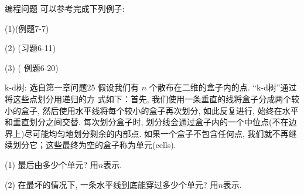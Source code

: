 \begin{exercise}{编程问题}
    可以参考完成下列例子: 

(1)(\cite{liu2014}例题7-7)

(2) (\cite{liu2014}习题6-11)

(3) (\cite{liu2014} 例题6-20)
    
\end{exercise}

\begin{exercise}{k-d树: 选自\cite{algobook}第一章问题25}
    假设我们有 $n$ 个散布在二维的盒子内的点. ``k-d树''通过将这些点划分用递归的方
    式如下：首先, 我们使用一条垂直的线将盒子分成两个较小的盒子, 然后使用水平线将每个较小的盒子再次划分, 如此反复进行, 始终在水平和垂直划分之间交替. 每次划分盒子时, 划分线会通过盒子内的一个中位点(不在边界上)尽可能均匀地划分剩余的内部点. 如果一个盒子不包含任何点, 我们就不再继续划分它；这些最终为空的盒子称为单元(cells). 

    (1) 最后由多少个单元? 用$n$表示.  

    (2) 在最坏的情况下, 一条水平线到底能穿过多少个单元? 用$n$表示. 
\end{exercise}